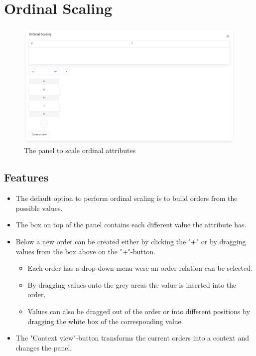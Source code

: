 \documentclass[]{article}
\begin{document}
\newpage
\section{Ordinal Scaling}
\begin{figure}[H]
	\includegraphics[width=\linewidth]{images/ordinal.png}
	\caption{The panel to scale ordinal attributes}
	\label{fig:p5}
\end{figure}
\subsection{Features}
\begin{itemize}
    \item The default option to perform ordinal scaling is to build orders from the possible values.
    \item The box on top of the panel contains each different value the attribute has.
    \item Below a new order can be created either by clicking the "+" or by dragging values from the box above on the "+"-button.
    \begin{itemize}
        \item Each order has a drop-down menu were an order relation can be selected.
        \item By dragging values onto the grey areas the value is inserted into the order.
        \item Values can also be dragged out of the order or into different positions by dragging the white box of the corresponding value.
    \end{itemize}
    \item The "Context view"-button transforms the current orders into a context and changes the panel.
\end{itemize}
\end{document}
